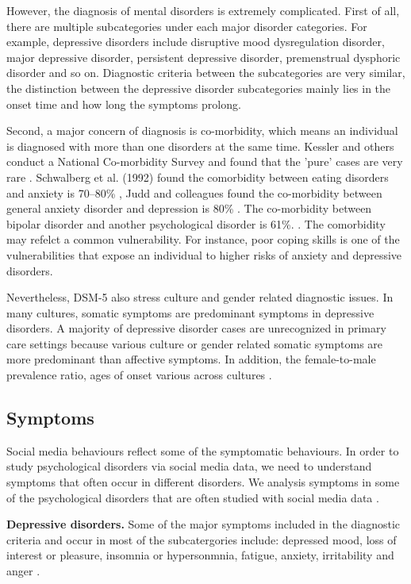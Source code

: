 However, the diagnosis of mental disorders is extremely complicated. First of all, there are multiple subcategories under each major disorder categories. For example, depressive disorders include disruptive mood dysregulation disorder, major depressive disorder, persistent depressive disorder, premenstrual dysphoric disorder and so on. Diagnostic criteria between the subcategories are very similar, the distinction between the depressive disorder subcategories mainly lies in the onset time and how long the symptoms prolong. 

Second, a major concern of diagnosis is co-morbidity, which means an individual is diagnosed with more than one disorders at the same time. Kessler and others conduct a National Co-morbidity Survey and found that the 'pure' cases are very rare \cite{kessler1994lifetime}. Schwalberg et al. (1992) found the comorbidity between eating disorders and anxiety is 70–80\% \cite{schwalberg1992comparison}, Judd and colleagues found the co-morbidity between general anxiety disorder and depression is 80\% \cite{judd1998comorbidity}. The co-morbidity between bipolar disorder and another psychological disorder is 61\%. \cite{raja2004clinical}. The comorbidity may refelct a common vulnerability. For instance, poor coping skills  \cite{andrews1996comorbidity} is one of the vulnerabilities that expose an individual to higher risks of anxiety and depressive disorders. 

Nevertheless, DSM-5 also stress culture and gender related diagnostic issues. In many cultures, somatic symptoms are predominant symptoms in depressive disorders. A majority of depressive disorder cases are unrecognized in primary care settings because various culture or gender related somatic symptoms are more predominant than affective symptoms. In addition, the female-to-male prevalence ratio, ages of onset various across cultures \cite{harvey2004cognitive}. 

\subsection{Symptoms}

Social media behaviours reflect some of the symptomatic behaviours. In order to study psychological disorders via social media data, we need to understand symptoms that often occur in different disorders. We analysis symptoms in some of the psychological disorders that are often studied with social media data \cite{american2013diagnostic}.

\textbf{Depressive disorders.} Some of the major symptoms included in the diagnostic criteria and occur in most of the subcatergories include: depressed mood, loss of interest or pleasure, insomnia or hypersonmnia, fatigue, anxiety, irritability and anger \cite{american2013diagnostic}.


